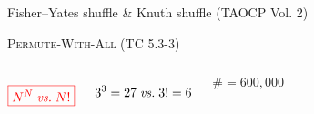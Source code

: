 
\begin{frame}{}

  \pause
  \vspace{0.60cm}
  \begin{center}
    Fisher–Yates shuffle \& Knuth shuffle {\small (TAOCP Vol. 2)} \\[20pt] \pause
  \end{center}
\end{frame}

\begin{frame}{}
  \begin{exampleblock}{\textsc{Permute-With-All} (TC 5.3-3)}
  \end{exampleblock}

  \begin{columns}
      \pause
      \[
          \textcolor{red}{\boxed{N^{N} \;\text{\emph{vs.}}\; N!}}
      \]

      \[
          3^3 = 27 \;\text{\emph{vs.}}\; 3! = 6
      \]
      \pause

      \vspace{-0.60cm}
      \[
        \# = 600, 000
      \]

      \vspace{-0.30cm}
      \begin{center}
        \href{https://blog.codinghorror.com/the-danger-of-naivete/}
           {}
      \end{center}
  \end{columns}
\end{frame}

